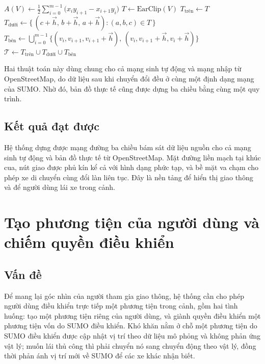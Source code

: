 ﻿\documentclass[../DoAn.tex]{subfiles}
\begin{document}
\begin{algorithm}[H]
	\caption{Dựng khối nút giao ba chiều}
	\label{alg:junction}
	$A(V) \leftarrow \tfrac{1}{2}\sum_{i=0}^{m-1}\big(x_i y_{i+1}-x_{i+1}y_i\big)$ 
	$T \leftarrow \mathrm{EarClip}(V)$ 
	$T_{\text{trên}} \leftarrow T$\;
	$T_{\text{dưới}} \leftarrow \big\{\,(c+\vec{h},\,b+\vec{h},\,a+\vec{h}) : (a,b,c)\in T\,\big\}$ 
	$T_{\text{bên}} \leftarrow \bigcup_{i=0}^{m-1}\big\{(v_i,v_{i+1},v_{i+1}+\vec{h}),\,(v_i,v_{i+1}+\vec{h},v_i+\vec{h})\big\}$\;
	$\mathcal{T} \leftarrow T_{\text{trên}} \cup T_{\text{dưới}} \cup T_{\text{bên}}$\;
\end{algorithm}

Hai thuật toán này dùng chung cho cả mạng sinh tự động và mạng nhập từ
OpenStreetMap, do dữ liệu sau khi chuyển đổi đều ở cùng một định dạng mạng của
\gls{SUMO}. Nhờ đó, bản đồ thực tế cũng được dựng ba chiều bằng cùng một quy
trình.

\subsection{Kết quả đạt được}

Hệ thống dựng được mạng đường ba chiều bám sát dữ liệu nguồn cho cả mạng sinh tự
động và bản đồ thực tế từ OpenStreetMap. Mặt đường liền mạch tại khúc cua, nút giao
được phủ kín kể cả với hình dạng phức tạp, và bề mặt va chạm cho phép xe di chuyển
cùng đổi làn liên tục. Đây là nền tảng để hiển thị giao thông và để người dùng lái
xe trong cảnh.

\section{Tạo phương tiện của người dùng và chiếm quyền điều khiển}
\label{sec:chiem-quyen}

\subsection{Vấn đề}

Để mang lại góc nhìn của người tham gia giao thông, hệ thống cần cho phép người
dùng điều khiển trực tiếp một phương tiện trong cảnh, gồm hai tình huống: tạo một
phương tiện riêng của người dùng, và giành quyền điều khiển một phương tiện vốn
do \gls{SUMO} điều khiển. Khó khăn nằm ở chỗ một phương tiện do \gls{SUMO} điều
khiển được cập nhật vị trí theo dữ liệu mô phỏng và không phản ứng vật lý; muốn
lái thủ công thì phải chuyển nó sang chuyển động theo vật lý, đồng thời phản ánh
vị trí mới về \gls{SUMO} để các xe khác nhận biết.
\end{document}
